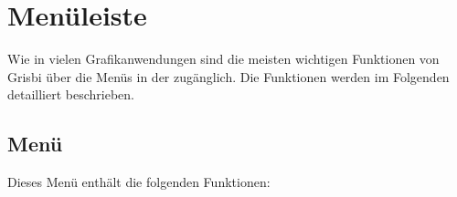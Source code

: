 \section{Menüleiste\label{home-menus}}

Wie in vielen Grafikanwendungen sind die meisten wichtigen Funktionen von Grisbi über die Menüs in der  zugänglich. Die Funktionen werden im Folgenden detailliert beschrieben.%


\subsection{Menü \label{home-menus-file}}

Dieses Menü enthält die folgenden Funktionen:

